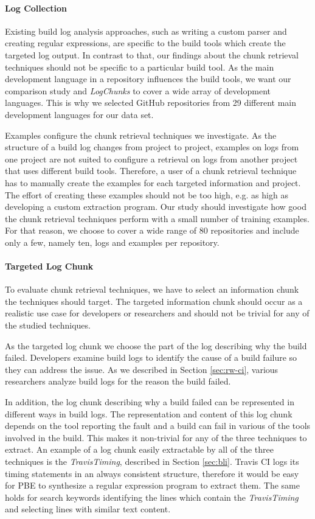 \documentclass[\myrootdir/main.tex]{subfiles}
\begin{document}
\paragraph{Log Collection}
Existing build log analysis approaches, such as writing a custom parser and creating regular expressions, are specific to the build tools which create the targeted log output.
In contrast to that, our findings about the chunk retrieval techniques should not be specific to a particular build tool.
As the main development language in a repository influences the build tools, we want our comparison study and \emph{LogChunks} to cover a wide array of development languages.
This is why we selected GitHub repositories from 29 different main development languages for our data set.

Examples configure the chunk retrieval techniques we investigate.
As the structure of a build log changes from project to project, examples on logs from one project are not suited to configure a retrieval on logs from another project that uses different build tools.
Therefore, a user of a chunk retrieval technique has to manually create the examples for each targeted information and project.
The effort of creating these examples should not be too high, e.g. as high as developing a custom extraction program.
Our study should investigate how good the chunk retrieval techniques perform with a small number of training examples.
For that reason, we choose to cover a wide range of 80 repositories and include only a few, namely ten, logs and examples per repository.

\paragraph{Targeted Log Chunk}
To evaluate chunk retrieval techniques, we have to select an information chunk the techniques should target.
The targeted information chunk should occur as a realistic use case for developers or researchers and should not be trivial for any of the studied techniques.

As the targeted log chunk we choose the part of the log describing why the build failed.
Developers examine build logs to identify the cause of a build failure so they can address the issue.
As we described in Section \ref{sec:rw-ci}, various researchers analyze build logs for the reason the build failed.

In addition, the log chunk describing why a build failed can be represented in different ways in build logs.
The representation and content of this log chunk depends on the tool reporting the fault and a build can fail in various of the tools involved in the build.
This makes it non-trivial for any of the three techniques to extract.
An example of a log chunk easily extractable by all of the three techniques is the \emph{TravisTiming}, described in Section \ref{sec:bli}.
Travis CI logs its timing statements in an always consistent structure, therefore it would be easy for PBE to synthesize a regular expression program to extract them.
The same holds for search keywords identifying the lines which contain the \emph{TravisTiming} and selecting lines with similar text content.
\end{document}
